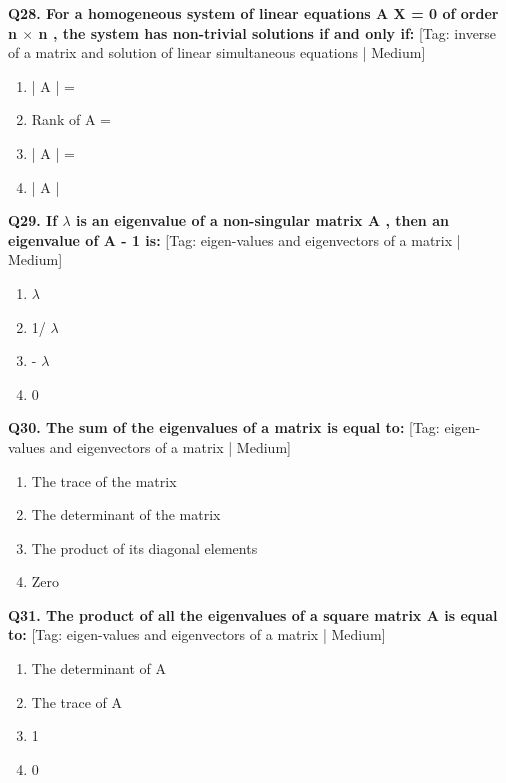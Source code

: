 \noindent\textbf{Q28. For a homogeneous system of linear equations A X = 0 of order n $\times$ n , the system has non-trivial solutions if and only if:} \hfill [Tag: inverse of a matrix and solution of linear simultaneous equations | Medium]
\begin{enumerate}[label=(\alph*),topsep=2pt,itemsep=1pt,partopsep=0pt,parsep=0pt]
    \item {{| A | =}}
    \item {{Rank of A =}}
    \item {{| A | =}}
    \item {{| A | }}
\end{enumerate}
\vspace{2mm}

\noindent\textbf{Q29. If $\lambda$ is an eigenvalue of a non-singular matrix A , then an eigenvalue of A - 1 is:} \hfill [Tag: eigen-values and eigenvectors of a matrix | Medium]
\begin{enumerate}[label=(\alph*),topsep=2pt,itemsep=1pt,partopsep=0pt,parsep=0pt]
    \item {{$\lambda$}}
    \item {{1/ $\lambda$}}
    \item {{- $\lambda$}}
    \item {{0}}
\end{enumerate}
\vspace{2mm}

\noindent\textbf{Q30. The sum of the eigenvalues of a matrix is equal to:} \hfill [Tag: eigen-values and eigenvectors of a matrix | Medium]
\begin{enumerate}[label=(\alph*),topsep=2pt,itemsep=1pt,partopsep=0pt,parsep=0pt]
    \item {{The trace of the matrix}}
    \item {{The determinant of the matrix}}
    \item {{The product of its diagonal elements}}
    \item {{Zero}}
\end{enumerate}
\vspace{2mm}

\noindent\textbf{Q31. The product of all the eigenvalues of a square matrix A is equal to:} \hfill [Tag: eigen-values and eigenvectors of a matrix | Medium]
\begin{enumerate}[label=(\alph*),topsep=2pt,itemsep=1pt,partopsep=0pt,parsep=0pt]
    \item {{The determinant of A}}
    \item {{The trace of A}}
    \item {{1}}
    \item {{0}}
\end{enumerate}
\vspace{2mm}

